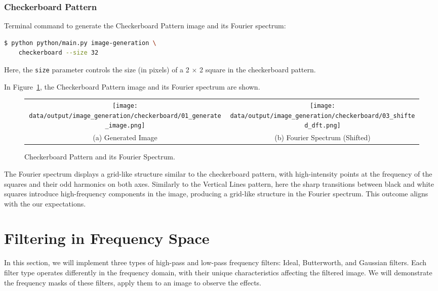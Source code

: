\documentclass[a4paper,12pt]{article}
\begin{document}
\subsubsection{Checkerboard Pattern}

Terminal command to generate the Checkerboard Pattern image and its Fourier spectrum:

\begin{lstlisting}[language=bash]
$ python python/main.py image-generation \
    checkerboard --size 32
\end{lstlisting}

Here, the \texttt{size} parameter controls the size (in pixels) of a 2 \(\times\) 2 square in the checkerboard pattern.

In Figure~\ref{fig:checkerboard-pattern}, the Checkerboard Pattern image and its Fourier spectrum are shown.

\begin{figure}
    \begin{tabular}{cc}
        \texttt{[image: data/output/image\_generation/checkerboard/01\_generate\_image.png]} &
        \texttt{[image: data/output/image\_generation/checkerboard/03\_shifted\_dft.png]} \\
        (a) Generated Image & (b) Fourier Spectrum (Shifted) \\
    \end{tabular}
    \caption{\label{fig:checkerboard-pattern} Checkerboard Pattern and its Fourier Spectrum.}
\end{figure}

The Fourier spectrum displays a grid-like structure similar to the checkerboard pattern, with high-intensity points at the frequency of the squares and their odd harmonics on both axes. Similarly to the Vertical Lines pattern, here the sharp transitions between black and white squares introduce high-frequency components in the image, producing a grid-like structure in the Fourier spectrum. This outcome aligns with the our expectations.

\newpage

\section{Filtering in Frequency Space}

In this section, we will implement three types of high-pass and low-pass frequency filters: Ideal, Butterworth, and Gaussian filters. Each filter type operates differently in the frequency domain, with their unique characteristics affecting the filtered image. We will demonstrate the frequency masks of these filters, apply them to an image to observe the effects.
\end{document}
